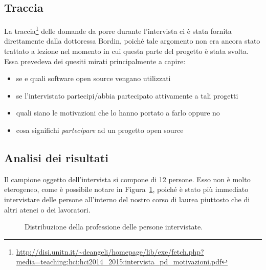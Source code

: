 \documentclass[12pt]{article} %
\begin{document}
\subsection{Traccia}
La traccia\footnote{\url{http://disi.unitn.it/~deangeli/homepage/lib/exe/fetch.php?media=teaching:hci:hci2014_2015:intervista_pd_motivazioni.pdf}} delle domande da porre durante l'intervista ci \`e stata fornita direttamente dalla dottoressa Bordin, poich\'e tale argomento non era ancora stato trattato a lezione nel momento in cui questa parte del progetto \`e stata svolta.\\
Essa prevedeva dei quesiti mirati principalmente a capire:
\begin{itemize}
\item se e quali software open source vengano utilizzati
\item se l'intervistato partecipi/abbia partecipato attivamente a tali progetti
\item quali siano le motivazioni che lo hanno portato a farlo oppure no
\item cosa significhi \emph{partecipare} ad un progetto open source
\end{itemize}

\subsection{Analisi dei risultati}
Il campione oggetto dell'intervista si compone di 12 persone. Esso non \`e molto eterogeneo, come \`e possibile notare in Figura~\ref{fig:distribuzione}, poich\'e \`e stato pi\`u immediato intervistare delle persone all'interno del nostro corso di laurea piuttosto che di altri atenei o dei lavoratori.

\begin{figure}[H]
\caption{Distribuzione della professione delle persone intervistate.}
\label{fig:distribuzione}
\end{figure}
\end{document}

